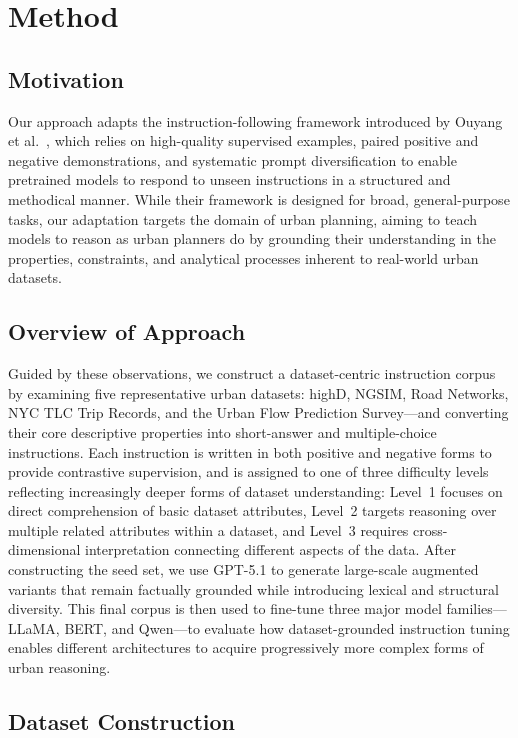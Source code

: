 \documentclass[a4paper,fleqn]{cas-sc}
\begin{document}
\section{Method}\label{sec4}
\subsection{Motivation}
Our approach adapts the instruction-following framework introduced by Ouyang et al.~\cite{ouyang2022training}, which relies on high-quality supervised examples, paired positive and negative demonstrations, and systematic prompt diversification to enable pretrained models to respond to unseen instructions in a structured and methodical manner. While their framework is designed for broad, general-purpose tasks, our adaptation targets the domain of urban planning, aiming to teach models to reason as urban planners do by grounding their understanding in the properties, constraints, and analytical processes inherent to real-world urban datasets.

\subsection{Overview of Approach}


Guided by these observations, we construct a dataset-centric instruction corpus by examining five representative urban datasets: highD, NGSIM, Road Networks, NYC TLC Trip Records, and the Urban Flow Prediction Survey—and converting their core descriptive properties into short-answer and multiple-choice instructions. Each instruction is written in both positive and negative forms to provide contrastive supervision, and is assigned to one of three difficulty levels reflecting increasingly deeper forms of dataset understanding: Level~1 focuses on direct comprehension of basic dataset attributes, Level~2 targets reasoning over multiple related attributes within a dataset, and Level~3 requires cross-dimensional interpretation connecting different aspects of the data. After constructing the seed set, we use GPT\mbox{-}5.1 to generate large-scale augmented variants that remain factually grounded while introducing lexical and structural diversity. This final corpus is then used to fine-tune three major model families—LLaMA, BERT, and Qwen—to evaluate how dataset-grounded instruction tuning enables different architectures to acquire progressively more complex forms of urban reasoning.

\subsection{Dataset Construction}
\end{document}

